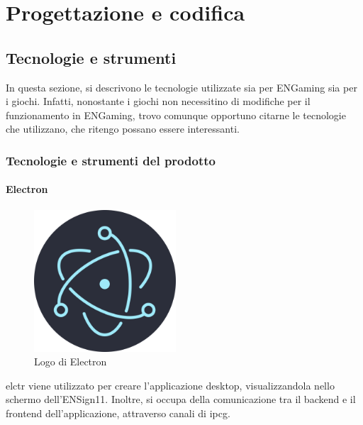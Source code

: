 \chapter{Progettazione e codifica}
\label{cap:progettazione-codifica}

\section{Tecnologie e strumenti}
\label{sec:tecnologie-strumenti}

In questa sezione, si descrivono le tecnologie utilizzate sia per ENGaming sia per i giochi.
Infatti, nonostante i giochi non necessitino di modifiche per il funzionamento in ENGaming, trovo comunque opportuno citarne le tecnologie che utilizzano, che ritengo possano essere interessanti.

\subsection{Tecnologie e strumenti del prodotto}

\subsubsection{Electron}
\begin{figure}[h]
    \centering
    \includegraphics[width=150pt]{images/technologies/electron.png}
    \caption{Logo di Electron}
    \label{fig:electron}
\end{figure}
\gls{elctr} viene utilizzato per creare l'applicazione desktop, visualizzandola nello schermo dell'ENSign11.
Inoltre, si occupa della comunicazione tra il backend e il frontend dell'applicazione, attraverso canali di \gls{ipcg}.
\newpage
